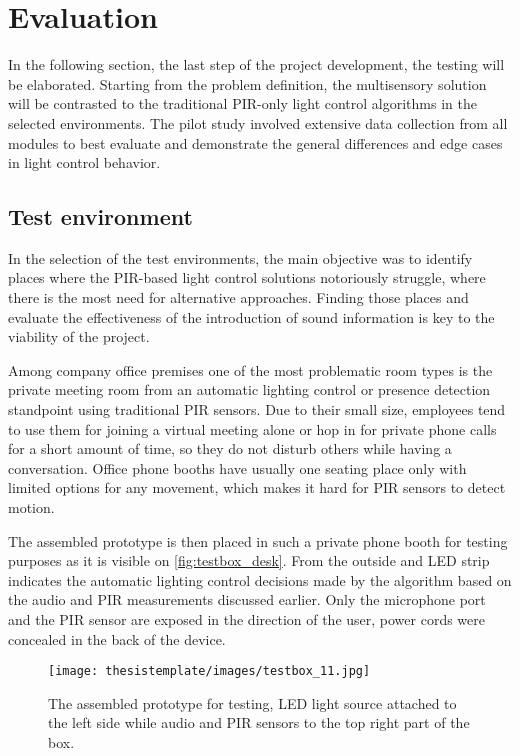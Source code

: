 \chapter{Evaluation}
\label{chapter:evaluation}


In the following section, the last step of the project development, the testing will be elaborated. Starting from the problem definition, the multisensory solution will be contrasted to the traditional PIR-only light control algorithms in the selected environments. The pilot study involved extensive data collection from all modules to best evaluate and demonstrate the general differences and edge cases in light control behavior.

\section{Test environment}

In the selection of the test environments, the main objective was to identify places where the PIR-based light control solutions notoriously struggle, where there is the most need for alternative approaches. Finding those places and evaluate the effectiveness of the introduction of sound information is key to the viability of the project.

Among company office premises one of the most problematic room types is the private meeting room from an automatic lighting control or presence detection standpoint using traditional PIR sensors. Due to their small size, employees tend to use them for joining a virtual meeting alone or hop in for private phone calls for a short amount of time, so they do not disturb others while having a conversation. Office phone booths have usually one seating place only with limited options for any movement, which makes it hard for PIR sensors to detect motion.

The assembled prototype is then placed in such a private phone booth for testing purposes as it is visible on \autoref{fig:testbox_desk}. From the outside and LED strip indicates the automatic lighting control decisions made by the algorithm based on the audio and PIR measurements discussed earlier. Only the microphone port and the PIR sensor are exposed in the direction of the user, power cords were concealed in the back of the device.


\begin{figure}[t!]
  \begin{center}
    \texttt{[image: thesistemplate/images/testbox\_11.jpg]}
    \caption{The assembled prototype for testing, LED light source attached to the left side while audio and PIR sensors to the top right part of the box.}
    \label{fig:testbox_desk}
  \end{center}
\end{figure}


